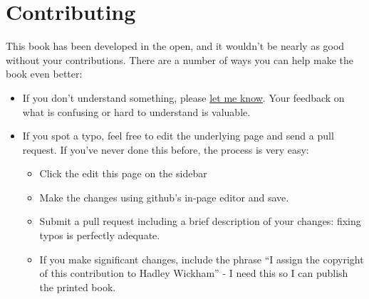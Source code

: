 \chapter{Contributing}

This book has been developed in the open, and it wouldn't be nearly as
good without your contributions. There are a number of ways you can help
make the book even better:

\begin{itemize}
\item
  If you don't understand something, please
  \href{mailto:h.wickham@gmail.com}{let me know}. Your feedback on what
  is confusing or hard to understand is valuable.
\item
  If you spot a typo, feel free to edit the underlying page and send a
  pull request. If you've never done this before, the process is very
  easy:

  \begin{itemize}
  \item
    Click the edit this page on the sidebar
  \item
    Make the changes using github's in-page editor and save.
  \item
    Submit a pull request including a brief description of your changes:
    fixing typos is perfectly adequate.
  \item
    If you make significant changes, include the phrase ``I assign the
    copyright of this contribution to Hadley Wickham'' - I need this so
    I can publish the printed book.
  \end{itemize}
\end{itemize}
